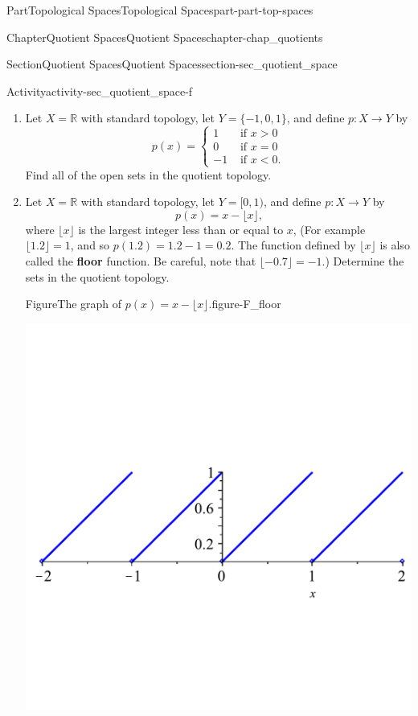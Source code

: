 \documentclass[oneside,10pt,]{book}
\newcommand{\terminology}[1]{\textbf{#1}}
\numberwithin{equation}{chapter}
\newcommand{\R}{\mathbb{R}}
\newcommand{\lt}{<}
\newcommand{\amp}{&}
\begin{document}
\begin{partptx}{Part}{Topological Spaces}{}{Topological Spaces}{}{}{part-part-top-spaces}
\begin{chapterptx}{Chapter}{Quotient Spaces}{}{Quotient Spaces}{}{}{chapter-chap_quotients}
\begin{sectionptx}{Section}{Quotient Spaces}{}{Quotient Spaces}{}{}{section-sec_quotient_space}
\begin{activity}{Activity}{}{activity-sec_quotient_space-f}
\begin{enumerate}[font=\bfseries,label=(\alph*),ref=\alph*]%
\item{}Let \(X=\R\) with standard topology, let \(Y=\{-1,0,1\}\), and define \(p:X \to Y\) by%
\begin{equation*}
p(x) = \begin{cases}1\amp \text{ if }  x>0 \\ 0 \amp \text{ if }  x=0 \\ -1 \amp \text{ if }  x\lt 0. \end{cases}
\end{equation*}
Find all of the open sets in the quotient topology.%
\item{}Let \(X=\R\) with standard topology, let \(Y=[0,1)\), and define \(p:X \to Y\) by%
\begin{equation*}
p(x) = x-\lfloor x\rfloor\text{,}
\end{equation*}
where \(\lfloor x\rfloor\) is the largest integer less than or equal to \(x\), (For example \(\lfloor 1.2 \rfloor = 1\), and so \(p(1.2) = 1.2 - 1 = 0.2\). The function defined by \(\lfloor x\rfloor\) is also called the \terminology{floor} function. Be careful, note that \(\lfloor -0.7 \rfloor = -1\).)  Determine the sets in the quotient topology.%
\begin{figureptx}{Figure}{The graph of \(p(x) = x - \lfloor x\rfloor\).}{figure-F_floor}{}%
\begin{image}{0.25}{0.5}{0.25}{}%
\includegraphics[width=\linewidth]{external/floor.pdf}

\end{image}
\end{figureptx}
\end{enumerate}
\end{activity}
\end{sectionptx}
\end{chapterptx}
\end{partptx}
\end{document}
